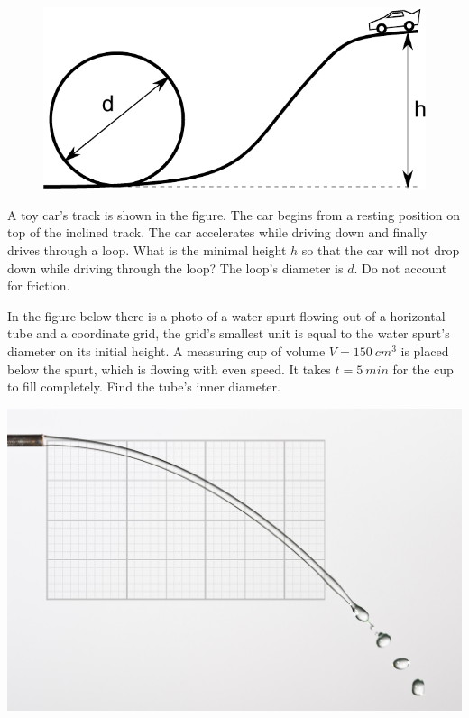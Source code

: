 \documentclass[11pt]{article}
\begin{document}
\probeng
\begin{figure}%
\includegraphics[width=\linewidth]{2012-v2g-05-silmus}%
\end{figure}
A toy car’s track is shown in the figure. The car begins from a resting position on top of the inclined track. The car accelerates while driving down and finally drives through a loop. What is the minimal height $h$ so that the car will not drop down while driving through the loop? The loop’s diameter is $d$. Do not account for friction.
\probend
\bigskip


\probeng
In the figure below there is a photo of a water spurt flowing out of a horizontal tube and a coordinate grid, the grid’s smallest unit is equal to the water spurt’s diameter on its initial height. A measuring cup of volume $V=\SI{150}{cm^3}$ is placed below the spurt, which is flowing with even speed.  It takes $t=\SI{5}{min}$ for the cup to fill completely. Find the tube’s inner diameter.
\begin{center}
\includegraphics[width=0.7\linewidth]{2012-v3g-02-jet}%
\end{center}
\probend
\bigskip
\end{document}
